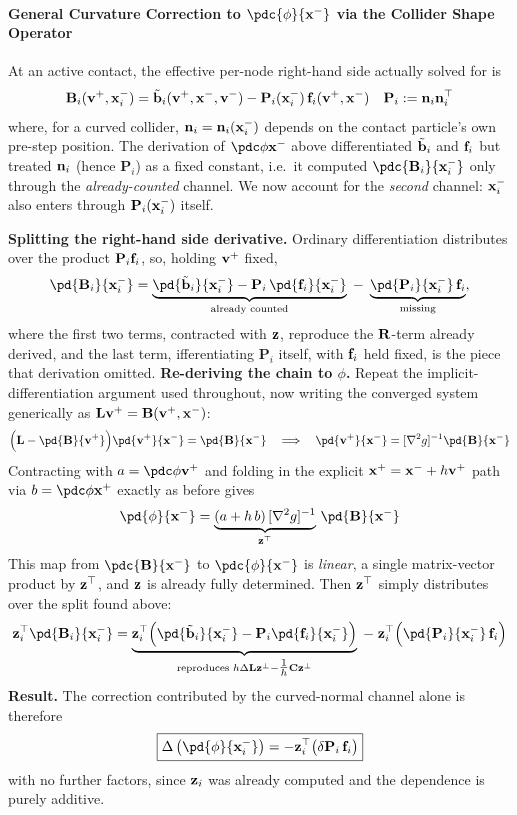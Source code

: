 \begin{derivation}
\paragraph{General Curvature Correction to $\pdc{\phi}{\x^-}$ via the Collider Shape Operator} \mbox{}\par\medskip

\begin{reminder}
At an active contact, the effective per-node right-hand side actually solved for is
$$
\mathbf{B}_i(\mathbf{v}^+,\mathbf{x}_i^-) = \tilde{\mathbf{b}}_i(\mathbf{v}^+,\mathbf{x}^-,\mathbf{v}^-) - \mathbf{P}_i(\mathbf{x}_i^-)\,\mathbf{f}_i(\mathbf{v}^+,\mathbf{x}^-)
\quad \mathbf{P}_i:=\mathbf{n}_i\mathbf{n}_i^\top
$$
where, for a curved collider, $\mathbf{n}_i=\mathbf{n}_i(\mathbf{x}_i^-)$ depends on the contact particle's own pre-step position. The derivation of $\pdc\phi{\x^-}$ above differentiated $\tilde{\mathbf{b}}_i$ and $\mathbf{f}_i$ but treated $\mathbf{n}_i$ (hence $\mathbf{P}_i$) as a fixed constant, i.e.\ it computed $\pdc{\B_i}{\x_i^-}$ only through the \emph{already-counted} channel. We now account for the
\emph{second} channel: $\mathbf{x}_i^-$ also enters through $\mathbf{P}_i(\mathbf{x}_i^-)$ itself.
\end{reminder}
\textbf{Splitting the right-hand side derivative.} Ordinary differentiation distributes over
the product $\mathbf{P}_i\mathbf{f}_i$, so, holding $\mathbf{v}^+$ fixed,
$$
\pd{\B_i}{\x_i^-}
=
\underbrace{\pd{\tilde\bb_i}{\x_i^-} - \mathbf{P}_i\,\pd{\f_i}{\x_i^-}}_{\text{already counted}}
\;-\;
\underbrace{\pd{\mathbf{P}_i}{\x_i^-}\,\f_i}_{\text{missing}},
$$
where the first two terms, contracted with $\mathbf{z}$, reproduce the $\mathbf{R}$-term already derived, and
the last term, ifferentiating $\mathbf{P}_i$ itself, with $\mathbf{f}_i$ held fixed, is the piece that
derivation omitted.
\newline\textbf{Re-deriving the chain to $\phi$.} Repeat the implicit-differentiation argument used
throughout, now writing the converged system generically as $\mathbf{L}\mathbf{v}^+=\mathbf{B}(\mathbf{v}^+,\mathbf{x}^-)$:
$$
\Big(\LL - \pd{\B}{\vv^+}\Big)\pd{\vv^+}{\x^-} = \pd{\B}{\x^-}
\quad\Longrightarrow\quad
\pd{\vv^+}{\x^-} = [\nabla^2 g]^{-1}\pd{\B}{\x^-}
$$
Contracting with $a=\pdc\phi{\vv^+}$ and folding in the explicit $\mathbf{x}^+=\mathbf{x}^-+h\mathbf{v}^+$ path via
$b=\pdc\phi{\x^+}$ exactly as before gives
$$
\pd{\phi}{\x^-} = \underbrace{(a+h\,b)\,[\nabla^2 g]^{-1}}_{\z^\top}\,\pd{\B}{\x^-}
$$
This map from $\pdc{\B}{\x^-}$ to $\pdc{\phi}{\x^-}$ is \emph{linear}, a single matrix-vector product by $\mathbf{z}^\top$, and $\mathbf{z}$ is already fully determined. Then $\mathbf{z}^\top$ simply distributes over the split found above:
$$
\z_i^\top\pd{\B_i}{\x_i^-}
=
\underbrace{\z_i^\top\Big(\pd{\tilde\bb_i}{\x_i^-}-\mathbf{P}_i\pd{\f_i}{\x_i^-}\Big)}_{\text{reproduces }h\Delta\LL\z^\perp-\tfrac1h\C\z^\perp}
\;-\;
\z_i^\top\Big(\pd{\mathbf{P}_i}{\x_i^-}\,\f_i\Big)
$$
\newline \textbf{Result.} The correction contributed by the curved-normal channel alone is therefore
\begin{equation}
    \boxed{
    \Delta\left(\pd{\phi}{\x_i^-}\right) = -\z_i^\top\big(\delta\mathbf{P}_i\,\f_i\big)
    }
\end{equation}
with no further factors, since $\mathbf{z}_i$ was already computed and the dependence is purely
additive.
\end{derivation}

